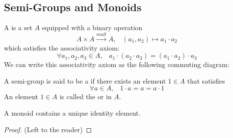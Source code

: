 \documentclass[12pt, a4paper, oneside, openright, titlepage]{book}
\begin{document}
\begin{appendices}
    \section{\textsection Semi-Groups and Monoids}
    
    \begin{defn}
        A  is a set $A$ equipped with a binary operation \begin{equation}
            A\times A \xrightarrow{mult} A,\;\;\;(a_1,a_2)\mapsto a_1\cdot a_2
        \end{equation}
        which satisfies the associativity axiom:\begin{equation}
            \forall a_1,a_2,a_3 \in A,\;\;\;a_1\cdot (a_2\cdot a_3) = (a_1\cdot a_2)\cdot a_3
        \end{equation}
        We can write this associativity axiom as the following commuting diagram:
        \begin{center}
        \end{center}
    \end{defn}
    
    \begin{defn}
        A semi-group is said to be a  if there exists an element $1 \in A$ that satisfies \begin{equation}
            \forall a \in A,\;\;\;1\cdot a = a = a \cdot 1
        \end{equation}
        An element $1 \in A$ is called the  or  in $A$.
    \end{defn}
    
    \begin{lem}
        A monoid contains a unique identity element.
        \begin{proof}
            (Left to the reader)
        \end{proof}
    \end{lem}
    

\end{appendices}
\end{document}
